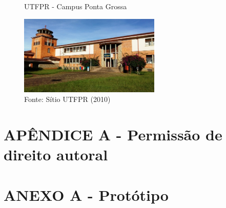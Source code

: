 \documentclass{utfpr-pg}
\begin{document}
\begin{figure}[h!]
    \centering
    \captionsetup{width=0.6\textwidth}
    \caption{UTFPR - Campus Ponta Grossa}
    \includegraphics[width=0.6\textwidth]{images/fachada-utfpr.jpg}
    \caption*{Fonte: Sítio UTFPR (2010)}
   	\label{fig:utfpr}
\end{figure}




\renewcommand{\bibsection}{%
	\chapter*{\bibname}
	\bibmark
	\ifnobibintoc\else
	\phantomsection
	\addcontentsline{toc}{chapter}{\hspace{-2cm}\texorpdfstring{\MakeTextUppercase{\bibname}}{\bibname}}
	\fi
	\prebibhook
}




\label{ch:bib}

\chapter*{APÊNDICE A - Permissão de direito autoral}
\label{ch:apendiceA}
  \blindtext

\chapter*{ANEXO A - Protótipo}
\label{ch:anexoA}
  \blindtext
\end{document}

